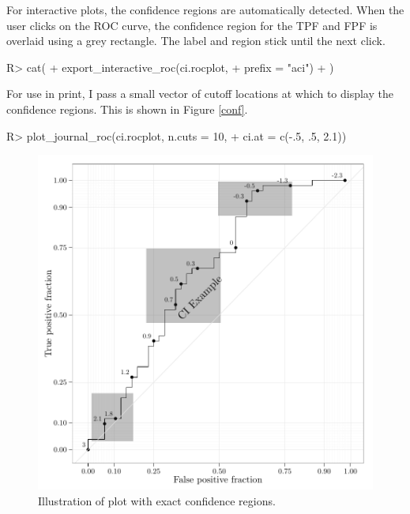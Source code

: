 \documentclass[codesnippet]{jss}
\begin{document}
For interactive plots, the confidence regions are automatically
detected. When the user clicks on the ROC curve, the confidence region
for the TPF and FPF is overlaid using a grey rectangle. The label and
region stick until the next click.

\begin{Schunk}
\begin{Sinput}
R> cat(
+   export_interactive_roc(ci.rocplot, 
+                          prefix = "aci")
+   )
\end{Sinput}
\end{Schunk}

For use in print, I pass a small vector of cutoff locations at which to
display the confidence regions. This is shown in Figure \ref{conf}.

\begin{Schunk}
\begin{Sinput}
R> plot_journal_roc(ci.rocplot, n.cuts = 10, 
+                  ci.at = c(-.5, .5, 2.1))
\end{Sinput}
\begin{figure}
\includegraphics{figure/printci-1} \caption{Illustration of  plot with exact confidence regions. \label{conf}}\label{fig:printci}
\end{figure}
\end{Schunk}
\end{document}
